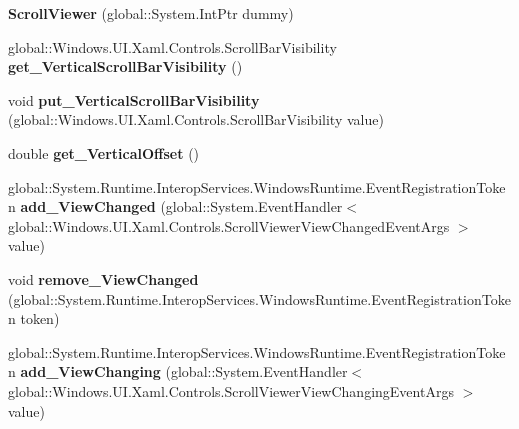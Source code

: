 \begin{DoxyCompactItemize}
{\bfseries Scroll\+Viewer} (global\+::\+System.\+Int\+Ptr dummy)
\item 
\mbox{\label{class_windows_1_1_u_i_1_1_xaml_1_1_controls_1_1_scroll_viewer_ae2150cc90ac054e44b19688d45254504}} 
global\+::\+Windows.\+U\+I.\+Xaml.\+Controls.\+Scroll\+Bar\+Visibility {\bfseries get\+\_\+\+Vertical\+Scroll\+Bar\+Visibility} ()
\item 
\mbox{\label{class_windows_1_1_u_i_1_1_xaml_1_1_controls_1_1_scroll_viewer_a4ebc42955ec0b6a9d1bb937a99db8d5a}} 
void {\bfseries put\+\_\+\+Vertical\+Scroll\+Bar\+Visibility} (global\+::\+Windows.\+U\+I.\+Xaml.\+Controls.\+Scroll\+Bar\+Visibility value)
\item 
\mbox{\label{class_windows_1_1_u_i_1_1_xaml_1_1_controls_1_1_scroll_viewer_a19208c9fc6f7a5b20ce2809e891eaf0a}} 
double {\bfseries get\+\_\+\+Vertical\+Offset} ()
\item 
\mbox{\label{class_windows_1_1_u_i_1_1_xaml_1_1_controls_1_1_scroll_viewer_ac4976aefef665f53fb870e4ce8813d73}} 
global\+::\+System.\+Runtime.\+Interop\+Services.\+Windows\+Runtime.\+Event\+Registration\+Token {\bfseries add\+\_\+\+View\+Changed} (global\+::\+System.\+Event\+Handler$<$ global\+::\+Windows.\+U\+I.\+Xaml.\+Controls.\+Scroll\+Viewer\+View\+Changed\+Event\+Args $>$ value)
\item 
\mbox{\label{class_windows_1_1_u_i_1_1_xaml_1_1_controls_1_1_scroll_viewer_a317f11553250f27cac32f2a138b5c4b4}} 
void {\bfseries remove\+\_\+\+View\+Changed} (global\+::\+System.\+Runtime.\+Interop\+Services.\+Windows\+Runtime.\+Event\+Registration\+Token token)
\item 
\mbox{\label{class_windows_1_1_u_i_1_1_xaml_1_1_controls_1_1_scroll_viewer_a8696c8cbca169c5458cf7c1bc6e483a9}} 
global\+::\+System.\+Runtime.\+Interop\+Services.\+Windows\+Runtime.\+Event\+Registration\+Token {\bfseries add\+\_\+\+View\+Changing} (global\+::\+System.\+Event\+Handler$<$ global\+::\+Windows.\+U\+I.\+Xaml.\+Controls.\+Scroll\+Viewer\+View\+Changing\+Event\+Args $>$ value)

\end{DoxyCompactItemize}
